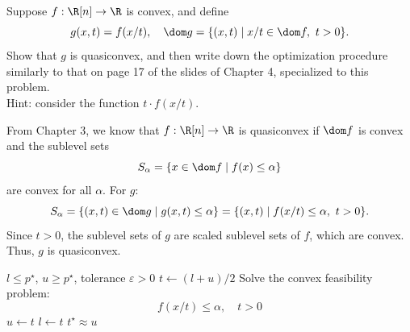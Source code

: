 \documentclass[11pt]{article}
\begin{document}
\makeAssignmentTitle

\begin{homeworkProblem}
    Suppose $f : \R[n] \to \R$ is convex, and define
    \[
        g(x, t) = f(x/t), \quad \dom g = \{(x, t) \mid x/t \in \dom f, \ t > 0\}.
    \]
    Show that $g$ is quasiconvex, and then write down the optimization procedure similarly to that on page 17
    of the slides of Chapter 4, specialized to this problem. \\

    Hint: consider the function $t \cdot f(x/t)$. \\

    \solution

    From Chapter 3, we know that $f : \R[n] \to \R$ is quasiconvex if $\dom f$ is convex and the sublevel sets
    \[
        S_\alpha = \{x \in \dom f \mid f(x) \leq \alpha \}
    \] are convex for all $\alpha$. For $g$:
    \[
        S_\alpha = \{(x, t) \in \dom g \mid g(x, t) \leq \alpha \} = \{(x, t) \mid f(x/t) \leq \alpha, \ t > 0\}.
    \]
    Since $t > 0$, the sublevel sets of $g$ are scaled sublevel sets of $f$, which are convex.
    Thus, $g$ is quasiconvex. \\

    \begin{algorithm}[H]
        \caption{Quasiconvex Optimization}
        \begin{algorithmic}[1]
            \Require $l \le p^\star$, $u \ge p^\star$, tolerance $\varepsilon > 0$
            \Repeat
            \State $t \gets (l + u)/2$
            \State Solve the convex feasibility problem:
            \[
                f(x/t) \leq \alpha, \quad t > 0
            \]
            \State $u \gets t$
            \Else
            \State $l \gets t$
            \EndIf
            \State \Return $t^\star \approx u$
        \end{algorithmic}
    \end{algorithm}


\end{homeworkProblem}

\pagebreak
\end{document}
